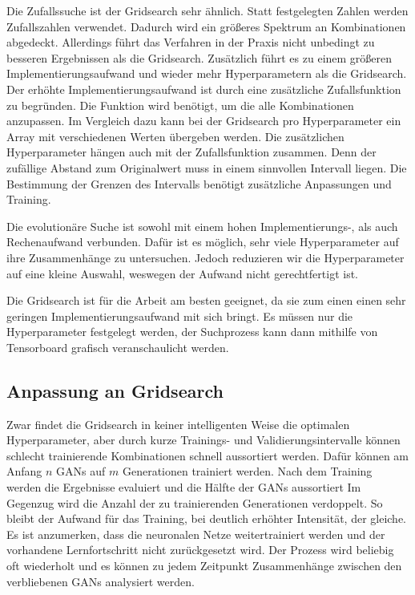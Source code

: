 Die Zufallssuche ist der Gridsearch sehr ähnlich.
Statt festgelegten Zahlen werden Zufallszahlen verwendet.
Dadurch wird ein größeres Spektrum an Kombinationen abgedeckt.
Allerdings führt das Verfahren in der Praxis nicht unbedingt zu besseren Ergebnissen als die Gridsearch.
Zusätzlich führt es zu einem größeren Implementierungsaufwand und wieder mehr Hyperparametern als die Gridsearch.
Der erhöhte Implementierungsaufwand ist durch eine zusätzliche Zufallsfunktion zu begründen.
Die Funktion wird benötigt, um die alle Kombinationen anzupassen.
Im Vergleich dazu kann bei der Gridsearch pro Hyperparameter ein Array mit verschiedenen Werten übergeben werden.
Die zusätzlichen Hyperparameter hängen auch mit der Zufallsfunktion zusammen.
Denn der zufällige Abstand zum Originalwert muss in einem sinnvollen Intervall liegen.
Die Bestimmung der Grenzen des Intervalls benötigt zusätzliche Anpassungen und Training.

Die evolutionäre Suche ist sowohl mit einem hohen Implementierungs-, als auch Rechenaufwand verbunden.
Dafür ist es möglich, sehr viele Hyperparameter auf ihre Zusammenhänge zu untersuchen.
Jedoch reduzieren wir die Hyperparameter auf eine kleine Auswahl, weswegen der Aufwand nicht gerechtfertigt ist.

Die Gridsearch ist für die Arbeit am besten geeignet, da sie zum einen einen sehr geringen Implementierungsaufwand mit sich bringt.
Es müssen nur die Hyperparameter festgelegt werden, der Suchprozess kann dann mithilfe von Tensorboard grafisch veranschaulicht werden.

\subsection{Anpassung an Gridsearch}
Zwar findet die Gridsearch in keiner intelligenten Weise die optimalen Hyperparameter, aber durch kurze Trainings- und Validierungsintervalle können schlecht trainierende Kombinationen schnell aussortiert werden.
Dafür können am Anfang $n$ GANs auf $m$ Generationen trainiert werden.
Nach dem Training werden die Ergebnisse evaluiert und die Hälfte der GANs aussortiert 
Im Gegenzug wird die Anzahl der zu trainierenden Generationen verdoppelt.
So bleibt der Aufwand für das Training, bei deutlich erhöhter Intensität, der gleiche.
Es ist anzumerken, dass die neuronalen Netze weitertrainiert werden und der vorhandene Lernfortschritt nicht zurückgesetzt wird.
Der Prozess wird beliebig oft wiederholt und es können zu jedem Zeitpunkt Zusammenhänge zwischen den verbliebenen GANs analysiert werden.





